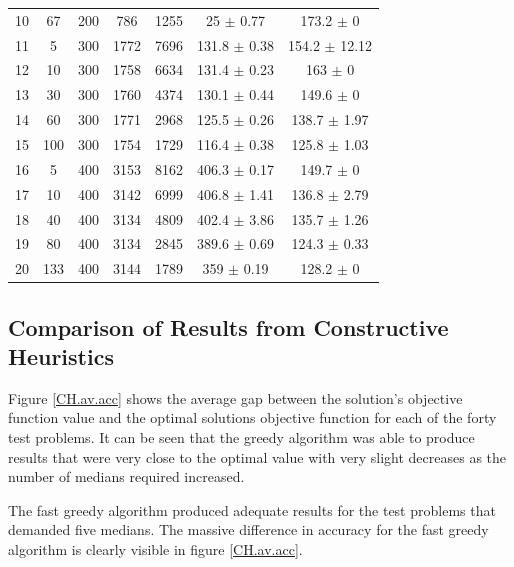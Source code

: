 \documentclass[11pt]{article}
\begin{document}
\begin{table}[]
{\begin{tabular}{ccccccc}
					10 & 67 & 200 & 786 & 1255 & 25 $\pm$ 0.77 & 173.2 $\pm$ 0 \\
					\rowcolor[HTML]{EFEFEF} 
					11 & 5 & 300 & 1772 & 7696 & 131.8 $\pm$ 0.38 & 154.2 $\pm$ 12.12 \\
					\rowcolor[HTML]{EFEFEF} 
					12 & 10 & 300 & 1758 & 6634 & 131.4 $\pm$ 0.23 & 163 $\pm$ 0 \\
					\rowcolor[HTML]{EFEFEF} 
					13 & 30 & 300 & 1760 & 4374 & 130.1 $\pm$ 0.44 & 149.6 $\pm$ 0 \\
					\rowcolor[HTML]{EFEFEF} 
					14 & 60 & 300 & 1771 & 2968 & 125.5 $\pm$ 0.26 & 138.7 $\pm$ 1.97 \\
					\rowcolor[HTML]{EFEFEF} 
					15 & 100 & 300 & 1754 & 1729 & 116.4 $\pm$ 0.38 & 125.8 $\pm$ 1.03 \\
					16 & 5 & 400 & 3153 & 8162 & 406.3 $\pm$ 0.17 & 149.7 $\pm$ 0 \\
					17 & 10 & 400 & 3142 & 6999 & 406.8 $\pm$ 1.41 & 136.8 $\pm$ 2.79 \\
					18 & 40 & 400 & 3134 & 4809 & 402.4 $\pm$ 3.86 & 135.7 $\pm$ 1.26 \\
					19 & 80 & 400 & 3134 & 2845 & 389.6 $\pm$ 0.69 & 124.3 $\pm$ 0.33 \\
					20 & 133 & 400 & 3144 & 1789 & 359 $\pm$ 0.19 & 128.2 $\pm$ 0
				\end{tabular}%
			}
		\end{table}

	\subsection{Comparison of Results from Constructive Heuristics} \label{classicheuristics.constructive.results}

	
	Figure \ref{CH.av.acc} shows the average gap between the solution's objective function value and the optimal solutions objective function for each of the forty test problems.  It can be seen that the greedy algorithm was able to produce results that were very close to the optimal value with very slight decreases as the number of medians required increased. 
	
	The fast greedy algorithm produced adequate results for the test problems that demanded five medians.  The massive difference in accuracy for the fast greedy algorithm is clearly visible in figure \ref{CH.av.acc}.
	
\end{document}
